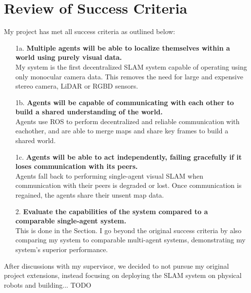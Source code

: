 

\label{sec:4}

\section{Review of Success Criteria}
\label{sec:review-of-success-criteria}
My project has met all success criteria as outlined below:

\begin{enumerate}[font=\bfseries]
  \item[1a.]\textbf{Multiple agents will be able to localize themselves within a world using purely visual data.} \\
  My system is the first decentralized SLAM system capable of operating using only monocular camera data. This removes the need for large and expensive stereo camera, LiDAR or RGBD sensors.

  \item[1b.]\textbf{Agents will be capable of communicating with each other to build a shared understanding of the world.} \\
  Agents use ROS to perform decentralized and reliable communication with eachother, and are able to merge maps and share key frames to build a shared world.

  \item[1c.]\textbf{Agents will be able to act independently, failing gracefully if it loses communication with its peers.} \\
  Agents fall back to performing single-agent visual SLAM when communication with their peers is degraded or lost. Once communication is regained, the agents share their unsent map data.

  \item[2.]\textbf{Evaluate the capabilities of the system compared to a comparable single-agent system.} \\
  This is done in the  Section. I go beyond the original success criteria by also comparing my system to comparable multi-agent systems, demonstrating my system's superior performance.

\end{enumerate}


After discussions with my supervisor, we decided to not pursue my original project extensions, instead focusing on deploying the SLAM system on physical robots and building... TODO

